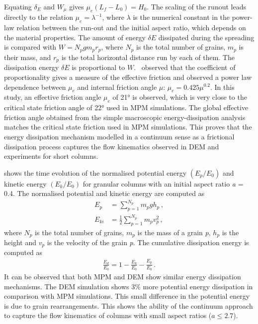 Equating $\delta_E$ and $W_{\mu}$ gives $\mu_e (L_f - L_0) = H_0$. The scaling
of the runout leads directly to the relation $\mu_e = \lambda^{-1}$, where 
$\lambda$ is the numerical constant in the power-law relation between the 
run-out and the initial aspect ratio, which depends on the 
material properties. 
The amount of energy $\delta E$ dissipated 
during the spreading is compared with $W = N_p g m_p r_p$, where $N_p$ is the 
total number of grains, $m_p$ is their mass, and $r_p$ is the total horizontal 
distance run by each of them. The dissipation energy $\delta E$ 
is proportional to $W$.~\cite{Staron2007a} observed that the coefficient of 
proportionality gives a measure of the effective friction and 
observed a power law dependence between $\mu_e$ and internal friction angle 
$\mu$: $\mu_e=0.425\mu^{0.2}$. In this study, an effective friction angle 
$\mu_e$ of 21\si{\degree} is observed, which is very close to the critical 
state friction angle of 22\si{\degree} used in MPM simulations. The global 
effective friction angle obtained from the simple macroscopic 
energy-dissipation analysis matches the critical state friction used in MPM 
simulations. This proves that the energy dissipation mechanism modelled in a 
continuum sense as a frictional dissipation process captures the flow 
kinematics observed in DEM and experiments for short columns.

 shows the time evolution of the normalised potential 
energy $(E_{p}/E_0)$ and kinetic energy $(E_{k}/E_0)$ for granular columns with 
an initial aspect ratio \textit{a} = 0.4. The normalised potential and kinetic 
energy 
are computed as
%
\begin{align}
E_p & = \sum\limits_{p=1}^{N_p}{m_p g h_p} \,, \\
E_{ki} & = \frac{1}{2}\sum\limits_{p=1}^{N_p}{m_p v_p^2} \,,
\end{align}
%
where $N_p$ is the total number of grains, $m_p$ is 
the mass of a grain \textit{p}, $h_p$ is the height and 
$v_p$ is the velocity of the grain \textit{p}. The cumulative dissipation 
energy is computed as
%
\begin{align}
\frac{E_d}{E_0} = 1 - \frac{E_k}{E_0} - \frac{E_p}{E_0} \,.
\end{align}
%
It can be observed that both MPM and DEM show similar energy dissipation 
mechanisms. The DEM simulation shows 3\% more potential energy dissipation in 
comparison with MPM simulations. This small difference in the potential energy 
is due to grain rearrangements. This shows the ability of the continuum 
approach to capture the flow kinematics of columns with small aspect ratios 
($a \le 
2.7$). 


